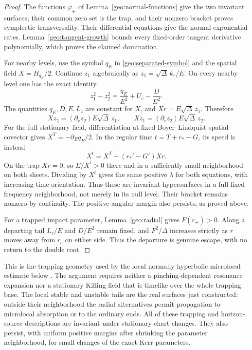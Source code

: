 \begin{proof}
The functions $\varphi_\pm$ of
Lemma~\ref{geo:normal-functions} give the two invariant surfaces;
their common zero set is the trap, and their nonzero bracket proves
symplectic transversality.  Their differential equations give the
normal exponential rates.  Lemma~\ref{geo:tangent-growth} bounds
every fixed-order tangent derivative polynomially, which proves
the claimed domination.

For nearby levels, use the symbol $q_E$ in
\eqref{geo:separated-symbol} and the spatial field
$X=H_{q_E}/2$.  Continue $z_1$ algebraically as
$z_1=\sqrt\Delta\,k_r/E$.  On every nearby level one has the
exact identity
\begin{equation}
 z_1^2-z_2^2=\frac{q_E}{E^2}+U_c-\frac{D}{E^2}.
 \label{geo:off-null-invariant}
\end{equation}
The quantities $q_E,D,E,L_z$ are constant for $X$, and
$Xr=E\sqrt\Delta\,z_1$.  Therefore
\[
 Xz_2=(\partial_rz_2)E\sqrt\Delta\,z_1,\qquad
 Xz_1=(\partial_rz_2)E\sqrt\Delta\,z_2.
\]
For the full stationary field, differentiation at fixed
Boyer--Lindquist spatial covector gives
$X^T=-\partial_Eq_E/2$.  In the regular time
$t=T+r_*-G$, its speed is instead
\[
 X^t=X^T+(r_*'-G')Xr.
\]
On the trap $Xr=0$, so $E/X^t>0$ there and in a sufficiently
small neighborhood on both sheets.  Dividing by $X^t$ gives the
same positive $\lambda$ for
both equations, with increasing-time orientation.  Thus these
are invariant hypersurfaces in a full fixed-frequency neighborhood,
not merely in its null level.  Their bracket remains nonzero by
continuity.  The positive angular margin also persists, as proved
above.

For a trapped impact parameter, Lemma~\ref{geo:radial} gives
$F(r_+)>0$.  Along a departing tail $L_z/E$ and $D/E^2$ remain
fixed, and $F^2/\Delta$ increases strictly as $r$ moves away from
$r_c$ on either side.  Thus the departure is genuine escape, with
no return to the double root.
\end{proof}

This is the trapping geometry used by the local normally
hyperbolic microlocal estimate below
\cite{Dyatlov2016,Hintz2017}.  The argument requires neither a
pinching-dependent resonance expansion nor a stationary Killing
field that is timelike over the whole trapping base.  The local
stable and unstable tails are the real surfaces just constructed;
outside their neighborhood the radial alternatives permit
propagation to microlocal absorption or to the ordinary ends.
All of these trapping and horizon-source descriptions are invariant
under stationary chart changes.  They also persist, with uniform
positive margins after shrinking the parameter neighborhood, for
small changes of the exact Kerr parameters.

